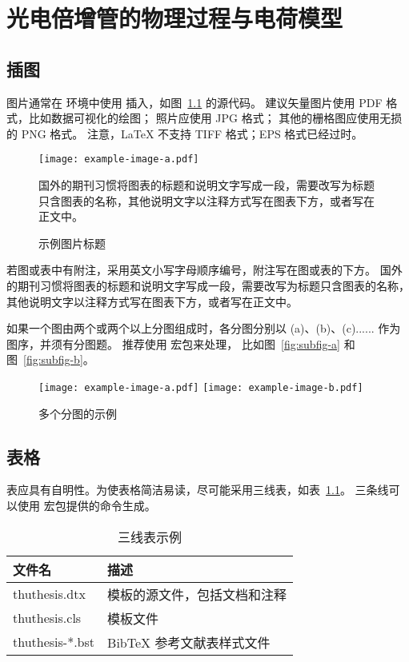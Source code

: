 
\chapter{光电倍增管的物理过程与电荷模型}

\section{插图}

图片通常在  环境中使用  插入，如图~\ref{fig:example} 的源代码。
建议矢量图片使用 PDF 格式，比如数据可视化的绘图；
照片应使用 JPG 格式；
其他的栅格图应使用无损的 PNG 格式。
注意，LaTeX 不支持 TIFF 格式；EPS 格式已经过时。

\begin{figure}
  \centering
  \texttt{[image: example-image-a.pdf]}
  \caption*{国外的期刊习惯将图表的标题和说明文字写成一段，需要改写为标题只含图表的名称，其他说明文字以注释方式写在图表下方，或者写在正文中。}
  \caption{示例图片标题}
  \label{fig:example}
\end{figure}

若图或表中有附注，采用英文小写字母顺序编号，附注写在图或表的下方。
国外的期刊习惯将图表的标题和说明文字写成一段，需要改写为标题只含图表的名称，其他说明文字以注释方式写在图表下方，或者写在正文中。

如果一个图由两个或两个以上分图组成时，各分图分别以 (a)、(b)、(c)...... 作为图序，并须有分图题。
推荐使用  宏包来处理， 比如图~\ref{fig:subfig-a} 和图~\ref{fig:subfig-b}。

\begin{figure}
  \centering
    {\texttt{[image: example-image-a.pdf]}}
    {\texttt{[image: example-image-b.pdf]}}
  \caption{多个分图的示例}
  \label{fig:multi-image}
\end{figure}



\section{表格}

表应具有自明性。为使表格简洁易读，尽可能采用三线表，如表~\ref{tab:three-line}。
三条线可以使用  宏包提供的命令生成。

\begin{table}
  \centering
  \caption{三线表示例}
  \begin{tabular}{ll}
    \toprule
    文件名          & 描述                         \\
    \midrule
    thuthesis.dtx   & 模板的源文件，包括文档和注释 \\
    thuthesis.cls   & 模板文件                     \\
    thuthesis-*.bst & BibTeX 参考文献表样式文件    \\
    \bottomrule
  \end{tabular}
  \label{tab:three-line}
\end{table}

